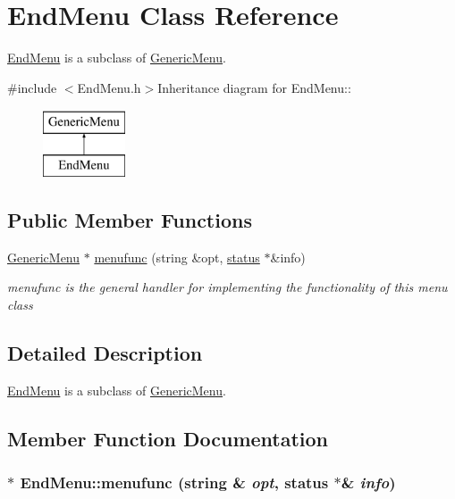 \hypertarget{classEndMenu}{
\section{EndMenu Class Reference}
\label{classEndMenu}
}


\hyperlink{classEndMenu}{EndMenu} is a subclass of \hyperlink{classGenericMenu}{GenericMenu}.  


{\ttfamily \#include $<$EndMenu.h$>$}Inheritance diagram for EndMenu::\begin{figure}[H]
\begin{center}
\leavevmode
\includegraphics[height=2cm]{classEndMenu}
\end{center}
\end{figure}
\subsection*{Public Member Functions}
\begin{DoxyCompactItemize}
\item 
\hyperlink{classGenericMenu}{GenericMenu} $\ast$ \hyperlink{classEndMenu_a8fc10a35897496066f1db862bad44028}{menufunc} (string \&opt, \hyperlink{classstatus}{status} $\ast$\&info)
\begin{DoxyCompactList}\small\item\em menufunc is the general handler for implementing the functionality of this menu class \item\end{DoxyCompactList}\end{DoxyCompactItemize}


\subsection{Detailed Description}
\hyperlink{classEndMenu}{EndMenu} is a subclass of \hyperlink{classGenericMenu}{GenericMenu}. 

\subsection{Member Function Documentation}
\hypertarget{classEndMenu_a8fc10a35897496066f1db862bad44028}{
\subsubsection[{menufunc}]{ $\ast$ EndMenu::menufunc (string \& {\em opt}, \/  {\bf status} $\ast$\& {\em info})}}
\label{classEndMenu_a8fc10a35897496066f1db862bad44028}


